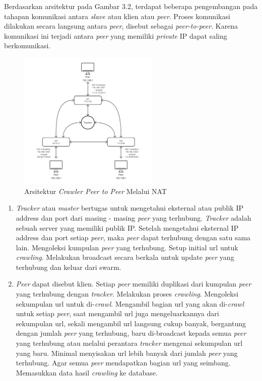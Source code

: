 Berdasarkan arsitektur pada Gambar 3.2, terdapat beberapa pengembangan pada tahapan komunikasi antara \emph{slave} atau klien atau \emph{peer}. Proses komunikasi dilakukan secara langsung antara \emph{peer}, disebut sebagai \emph{peer-to-peer}. Karena komunikasi ini terjadi antara \emph{peer} yang memiliki \emph{private} IP dapat saling berkomunikasi. 

\begin{figure}[H]
  \centering{}
	\includegraphics[width=0.6\textwidth]{gambar/peer_to_peer_through_nat}
  \caption{Arsitektur \emph{Crawler Peer to Peer} Melalui NAT}
\end{figure}

\begin{enumerate}
  \item{\emph{Tracker} atau \emph{master} bertugas untuk mengetahui eksternal atau publik IP address dan port dari masing - masing \emph{peer} yang terhubung. \emph{Tracker} adalah sebuah server yang memiliki publik IP. Setelah mengetahui eksternal IP address dan port setiap \emph{peer}, maka \emph{peer} dapat terhubung dengan satu sama lain. Mengoleksi kumpulan \emph{peer} yang terhubung. Setup initial url untuk \emph{crawling}. Melakukan broadcast secara berkala untuk update \emph{peer} yang terhubung dan keluar dari swarm.} 

  \item{\emph{Peer} dapat disebut klien. Setiap \emph{peer} memiliki duplikasi dari kumpulan \emph{peer} yang terhubung dengan \emph{tracker}. Melakukan proses \emph{crawling}. Mengoleksi sekumpulan url untuk di-\emph{crawl}. Mengambil bagian url yang akan di-\emph{crawl} untuk setiap \emph{peer}, saat mengambil url juga mengeluarkannya dari sekumpulan url, sekali mengambil url langsung cukup banyak, bergantung dengan jumlah \emph{peer} yang terhubung, baru di-broadcast kepada semua \emph{peer} yang terhubung atau melalui perantara \emph{tracker} mengenai sekumpulan url yang baru. Minimal menyisakan url lebih banyak dari jumlah \emph{peer} yang terhubung. Agar semua \emph{peer} mendapatkan bagian url yang seimbang. Memasukkan data hasil \emph{crawling} ke database.}
\end{enumerate}

